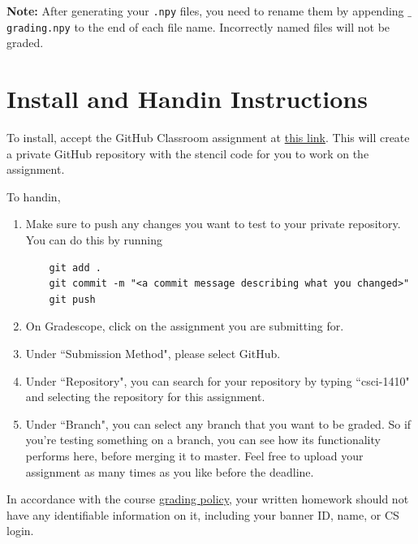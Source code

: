 \documentclass{article}
\begin{document}
\textbf{Note:} After generating your \texttt{.npy} files, you need to rename
them by appending \texttt{$\_$grading.npy} to the end of each file name.
Incorrectly named files will not be graded.


\section{Install and Handin Instructions}
To install, accept the GitHub Classroom assignment at \href{https://classroom.github.com/a/go7hYD7v}{this link}. This will
create a private GitHub repository with the stencil code for you to work on the
assignment.

To handin,
\begin{enumerate}
  \item Make sure to push any changes you want to test to your private
    repository. You can do this by running
    \begin{verbatim}
    git add .
    git commit -m "<a commit message describing what you changed>"
    git push
    \end{verbatim}

  \item On Gradescope, click on the assignment you are submitting for.

  \item Under ``Submission Method", please select GitHub.

  \item Under ``Repository", you can search for your repository by typing ``csci-1410"
    and selecting the repository for this assignment.

  \item Under ``Branch", you can select any branch that you want to be graded. So if
    you're testing something on a branch, you can see how its functionality
    performs here, before merging it to master. Feel free to upload your assignment
    as many times as you like before the deadline.
\end{enumerate}

In accordance with the course \href {https://cs1410-website.vercel.app/files/Collaboration_Policy.pdf}{grading policy},
your written homework should not have any identifiable information on it,
including your banner ID, name, or CS login.
\end{document}
